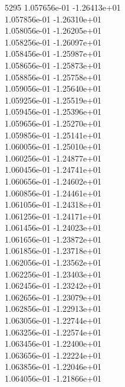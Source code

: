 5295	1.057656e-01	-1.26413e+01	\\ 	1.057856e-01	-1.26310e+01	\\ 	1.058056e-01	-1.26205e+01	\\ 	1.058256e-01	-1.26097e+01	\\ 	1.058456e-01	-1.25987e+01	\\ 	1.058656e-01	-1.25873e+01	\\ 	1.058856e-01	-1.25758e+01	\\ 	1.059056e-01	-1.25640e+01	\\ 	1.059256e-01	-1.25519e+01	\\ 	1.059456e-01	-1.25396e+01	\\ 	1.059656e-01	-1.25270e+01	\\ 	1.059856e-01	-1.25141e+01	\\ 	1.060056e-01	-1.25010e+01	\\ 	1.060256e-01	-1.24877e+01	\\ 	1.060456e-01	-1.24741e+01	\\ 	1.060656e-01	-1.24602e+01	\\ 	1.060856e-01	-1.24461e+01	\\ 	1.061056e-01	-1.24318e+01	\\ 	1.061256e-01	-1.24171e+01	\\ 	1.061456e-01	-1.24023e+01	\\ 	1.061656e-01	-1.23872e+01	\\ 	1.061856e-01	-1.23718e+01	\\ 	1.062056e-01	-1.23562e+01	\\ 	1.062256e-01	-1.23403e+01	\\ 	1.062456e-01	-1.23242e+01	\\ 	1.062656e-01	-1.23079e+01	\\ 	1.062856e-01	-1.22913e+01	\\ 	1.063056e-01	-1.22744e+01	\\ 	1.063256e-01	-1.22574e+01	\\ 	1.063456e-01	-1.22400e+01	\\ 	1.063656e-01	-1.22224e+01	\\ 	1.063856e-01	-1.22046e+01	\\ 	1.064056e-01	-1.21866e+01	\\ \hline
